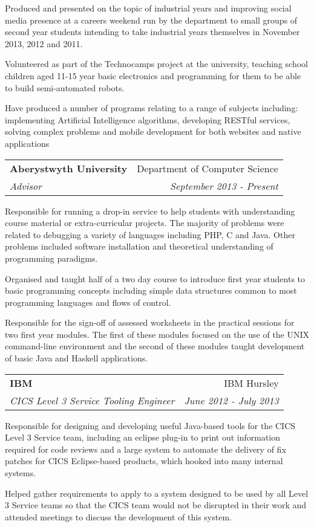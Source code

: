 \documentclass[letterpaper,11pt]{article}
\makeatletter
\newlength{\outerbordwidth}
\newcommand{\resheading}[1]{\vspace{8pt}
  \parbox{\textwidth}{\setlength{\FrameSep}{\outerbordwidth}
    \begin{shaded}
\setlength{\fboxsep}{0pt}\framebox[\textwidth][l]{\setlength{\fboxsep}{4pt}\fcolorbox{shadecolorB}{shadecolorB}{\textbf{\sffamily{\mbox{~}\makebox[6.762in][l]{\large #1} \vphantom{p\^{E}}}}}}
    \end{shaded}
  }\vspace{-5pt}
}
\newcommand{\ressubheading}[4]{
\vspace{10pt}
\begin{tabular*}{6.5in}{l@{\cftdotfill{\cftsecdotsep}\extracolsep{\fill}}r}
		\textbf{#1} & #2 \\
		\textit{#3} & \textit{#4} \\
\end{tabular*}\vspace{-6pt}
\vspace{10pt}}
\makeatother
\begin{document}
Produced and presented on the topic of industrial years and improving social
media presence at a careers weekend run by the department to small groups of
second year students intending to take industrial years themselves in November
2013, 2012 and 2011.

Volunteered as part of the Technocamps project at the university, teaching 
school children aged 11-15 year basic electronics and programming for them to 
be able to build semi-automated robots.

Have produced a number of programs relating to a range of subjects including: 
implementing Artificial Intelligence algorithms, developing RESTful services,
solving complex problems and mobile development for both websites and native 
applications


\resheading{Work Experience}

\ressubheading{Aberystwyth University}{Department of Computer Science}{Advisor}
{September 2013 - Present}

Responsible for running a drop-in service to help students with understanding
course material or extra-curricular projects. The majority of problems were
related to debugging a variety of languages including PHP, C and Java. Other
problems included software installation and theoretical understanding of 
programming paradigms.

Organised and taught half of a two day course to introduce first year students
to basic programming concepts including simple data structures common to most
programming languages and flows of control.

Responsible for the sign-off of assessed worksheets in the practical sessions
for two first year modules. The first of these modules
focused on the use of the UNIX command-line environment and the second of these
modules taught development of basic Java and Haskell applications.

\ressubheading{IBM}{IBM Hursley}{CICS Level 3 Service Tooling Engineer}
{June 2012 - July 2013}

Responsible for designing and developing useful Java-based tools for the CICS 
Level 3 Service team, including an eclipse plug-in to print out information 
required for code reviews and a large system to automate the delivery of fix 
patches for CICS Eclipse-based products, which hooked into many internal 
systems.

Helped gather requirements to apply to a system designed to be used by all 
Level 3 Service teams so that the CICS team would not be disrupted in their 
work and attended meetings to discuss the development of this system.
\end{document}
